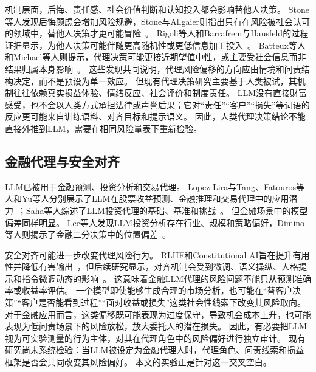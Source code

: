机制层面，后悔、责任感、社会价值判断和认知投入都会影响替他人决策。
Stone等人发现后悔顾虑会增加风险规避，Stone与Allgaier则指出只有在风险被社会认可的领域中，替他人决策才更可能冒险~\cite{Stone2002Risk,Stone2008Social}。
Rigoli等人和Barrafrem与Hausfeld的过程证据显示，为他人决策可能伴随更高随机性或更低信息加工投入~\cite{Rigoli2018Risk,Barrafrem2020Tracing}。
Batteux等人和Michael等人则提示，代理决策可能更接近期望值中性，或主要受社会信息而非结果归属本身影响~\cite{Batteux2017Risk,Batteux2020Decisions,Michael2021Decision}。
这些发现共同说明，代理风险偏移的方向应由情境和问责结构决定，而不是预设为单一效应。
但现有代理决策研究主要基于人类被试，其机制往往依赖真实损益体验、情绪反应、社会评价和制度责任。
LLM没有直接财富感受，也不会以人类方式承担法律或声誉后果；它对“责任”“客户”“损失”等词语的反应更可能来自训练语料、对齐目标和提示语义。
因此，人类代理决策结论不能直接外推到LLM，需要在相同风险量表下重新检验。

\subsection{金融代理与安全对齐}

LLM已被用于金融预测、投资分析和交易代理。
Lopez-Lira与Tang、Fatouros等人和Yu等人分别展示了LLM在股票收益预测、金融推理和交易代理中的应用潜力~\cite{LopezLira2023Can,Fatouros2024Can,Yu2023FinMem}；Saha等人综述了LLM投资代理的基础、基准和挑战~\cite{Saha2025Large}。
但金融场景中的模型偏差同样明显。
Lee等人发现LLM投资分析存在行业、规模和策略偏好，Dimino等人则揭示了金融二分决策中的位置偏差~\cite{Lee2025Your,Dimino2025Tracing}。

安全对齐可能进一步改变代理风险行为。
RLHF和Constitutional AI旨在提升有用性并降低有害输出~\cite{Ouyang2022Training,Bai2022Constitutional}，但后续研究显示，对齐机制会受到微调、语义操纵、人格提示和指令微调动态的影响~\cite{Qi2024Finetuning,McIntosh2024Inadequacy,Liu2024Evaluating,Wu2024Language}。
这意味着金融LLM代理的风险问题不能只从预测准确率或收益率评估。
一个模型即使能够生成合理的市场分析，也可能在“替客户决策”“客户是否能看到过程”“面对收益或损失”这类社会性线索下改变其风险取向。
对于金融应用而言，这类偏移既可能表现为过度保守，导致机会成本上升，也可能表现为低问责场景下的风险放松，放大委托人的潜在损失。
因此，有必要把LLM视为可实验测量的行为主体，对其在代理角色中的风险偏好进行独立审计。
现有研究尚未系统检验：当LLM被设定为金融代理人时，代理角色、问责线索和损益框架是否会共同改变其风险偏好。
本文的实验正是针对这一交叉空白。
